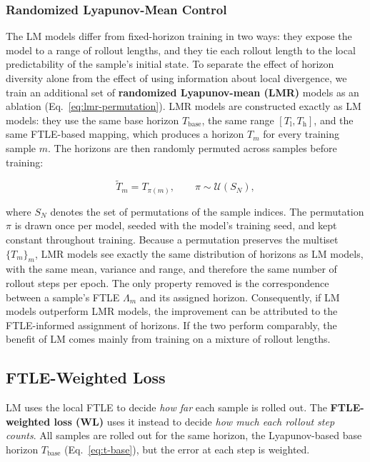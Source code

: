 \documentclass{article}
\begin{document}
\subsubsection{Randomized Lyapunov-Mean Control}
\label{sec:lmr}

The LM models differ from fixed-horizon training in two ways: they expose the model to a range of rollout lengths, and they tie each rollout length to the local predictability of the sample's initial state. To separate the effect of horizon diversity alone from the effect of using information about local divergence, we train an additional set of \textbf{randomized Lyapunov-mean (LMR)} models as an ablation (Eq.~\eqref{eq:lmr-permutation}). LMR models are constructed exactly as LM models: they use the same base horizon $T_{\mathrm{base}}$, the same range $[T_{\mathrm{l}}, T_{\mathrm{h}}]$, and the same FTLE-based mapping, which produces a horizon $T_m$ for every training sample $m$. The horizons are then randomly permuted across samples before training:

\begin{equation}
  \tilde{T}_m = T_{\pi(m)}, \qquad \pi \sim \mathcal{U}(S_N),
  \label{eq:lmr-permutation}
\end{equation}

where $S_N$ denotes the set of permutations of the sample indices. The permutation $\pi$ is drawn once per model, seeded with the model's training seed, and kept constant throughout training. Because a permutation preserves the multiset $\{T_m\}_m$, LMR models see exactly the same distribution of horizons as LM models, with the same mean, variance and range, and therefore the same number of rollout steps per epoch. The only property removed is the correspondence between a sample's FTLE $\Lambda_m$ and its assigned horizon. Consequently, if LM models outperform LMR models, the improvement can be attributed to the FTLE-informed assignment of horizons. If the two perform comparably, the benefit of LM comes mainly from training on a mixture of rollout lengths.

\subsection{FTLE-Weighted Loss}
\label{sec:wl}

LM uses the local FTLE to decide \emph{how far} each sample is rolled out. The \textbf{FTLE-weighted loss (WL)} uses it instead to decide \emph{how much each rollout step counts}. All samples are rolled out for the same horizon, the Lyapunov-based base horizon $T_{\mathrm{base}}$ (Eq.~\eqref{eq:t-base}), but the error at each step is weighted.
\end{document}
